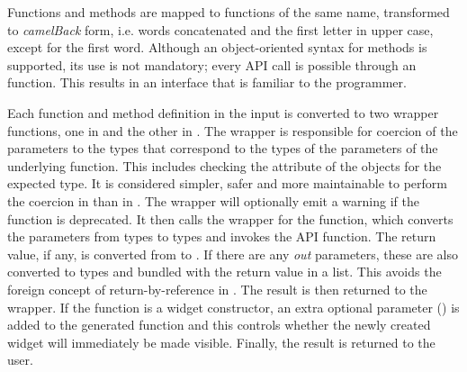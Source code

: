 \documentclass[article,shortnames]{jss}
\begin{document}
Functions and methods are mapped to  functions of the same
name, transformed to \emph{camelBack} form, i.e. words concatenated
and the first letter in upper case, except for the first word.
Although an object-oriented syntax for methods is supported, its use
is not mandatory; every API call is possible through an 
function. This results in an interface that is familiar to the
 programmer. 

Each function and method definition in the
 input is converted to two wrapper functions, one in
 and the other in .  The  wrapper
is responsible for coercion of the parameters to the 
types that correspond to the  types of the parameters of
the underlying  function. This includes checking the
 attribute of the  objects for the
expected type.  It is considered simpler, safer and more maintainable
to perform the coercion in  than in . The
 wrapper will optionally emit a warning if the function is
deprecated.  It then calls the  wrapper for the function,
which converts the parameters from  types to 
types and invokes the API function. The return value, if any, is
converted from  to . If there are any
\emph{out} parameters, these are also converted to  types
and bundled with the return value in a list. This avoids the foreign
concept of return-by-reference in . The result is then
returned to the  wrapper. If the function is a widget
constructor, an extra optional parameter () is added to the
generated  function and this controls whether the newly
created widget will immediately be made visible. Finally, the result
is returned to the user.
\end{document}

